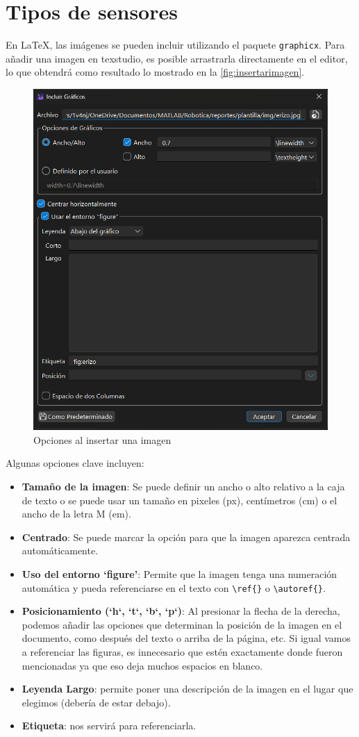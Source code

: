 \section{Tipos de sensores}
En \LaTeX, las imágenes se pueden incluir utilizando el paquete \texttt{graphicx}. 
Para añadir una imagen en texstudio, es posible arrastrarla directamente en el editor, lo que obtendrá como resultado lo mostrado en la \autoref{fig:insertarimagen}.

\begin{figure}[h]
	\centering
	\includegraphics[width=0.7\linewidth]{img/insertarImagen}
	\caption{Opciones al insertar una imagen}
	\label{fig:insertarimagen}
\end{figure}

Algunas opciones clave incluyen:

\begin{itemize}
	\item \textbf{Tamaño de la imagen}: Se puede definir un ancho o alto relativo a la caja de texto o se puede usar un tamaño en pixeles (px), centímetros (cm) o el ancho de la letra M (em).
	\item \textbf{Centrado}: Se puede marcar la opción para que la imagen aparezca centrada automáticamente.
	\item \textbf{Uso del entorno `figure'}: Permite que la imagen tenga una numeración automática y pueda referenciarse en el texto con \texttt{\textbackslash ref\{\}} o \texttt{\textbackslash autoref\{\}}.
	\item \textbf{Posicionamiento (`h`, `t`, `b`, `p`)}: Al presionar la flecha de la derecha, podemos añadir las opciones que determinan la posición de la imagen en el documento, como después del texto o arriba de la página, etc. Si igual vamos a referenciar las figuras, es innecesario que estén exactamente donde fueron mencionadas ya que eso deja muchos espacios en blanco.
	\item \textbf{Leyenda Largo}: permite poner una descripción de la imagen en el lugar que elegimos (debería de estar debajo).
	\item \textbf{Etiqueta}: nos servirá para referenciarla. 
\end{itemize}

